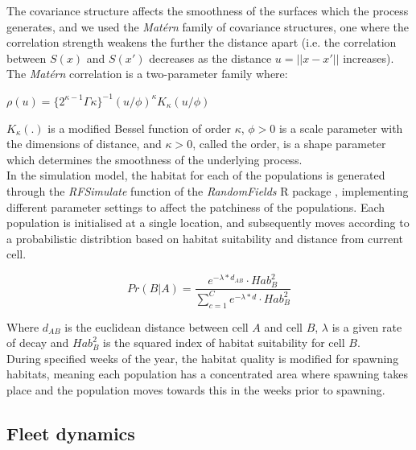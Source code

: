 \documentclass[review]{elsarticle}
\begin{document}
The covariance structure affects the smoothness of the surfaces which the
process generates, and we used the \textit{Matérn} family of covariance
structures, one where the correlation strength weakens the further the distance
apart (i.e. the correlation between $S(x)$ and $S(x')$ decreases as the
distance $u = ||x - x'||$ increases).  The \textit{Matérn} correlation is a
two-parameter family where: \\

\begin{center}
	$\rho(u) = \{2^{\kappa -
		1}\Gamma{\kappa}\}^{-1}(u/\phi)^{\kappa}K_{\kappa}(u/\phi)$
\end{center}
	
$K_{\kappa}(.)$ is a modified Bessel function of order $\kappa$, $\phi >
0$ is a scale parameter with the dimensions of distance, and $\kappa > 0$,
called the order, is a shape parameter which determines the smoothness of the
underlying process. \\

In the simulation model, the habitat for each of the populations is generated
through the \textit{RFSimulate} function of the \textit{RandomFields} R package
\cite{Schlater2015}, implementing different parameter settings to affect the
patchiness of the populations. Each population is initialised at a single
location, and subsequently moves according to a probabilistic distribtion based
on habitat suitability and distance from current cell. 

\begin{equation}
	Pr(B | A) = \frac{e^{-\lambda * d_{AB}} \cdot
		Hab_{B}^2}{\sum\limits_{c=1}^{C}e^{-\lambda * d} \cdot
		Hab_{B}^2}
\end{equation}

Where $d_{AB}$ is the euclidean distance between cell $A$ and cell $B$,
$\lambda$ is a given rate of decay and $Hab_{B}^2$ is the squared index of
habitat suitability for cell $B$.\\

During specified weeks of the year, the habitat quality is modified for
spawning habitats, meaning each population has a concentrated area where
spawning takes place and the population moves towards this in the weeks prior
to spawning. \\

\subsection{Fleet dynamics}
\end{document}

